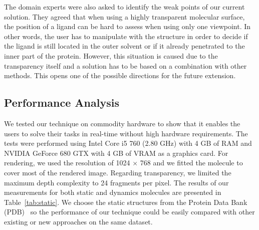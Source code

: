 The domain experts were also asked to identify the weak points of our current solution.
They agreed that when using a highly transparent molecular surface, the position of a ligand can be hard to assess when using only one viewpoint.
In other words, the user has to manipulate with the structure in order to decide if the ligand is still located in the outer solvent or if it already penetrated to the inner part of the protein.
However, this situation is caused due to the transparency itself and a solution has to be based on a combination with other methods.
This opens one of the possible directions for the future extension.

\subsection{Performance Analysis}
\label{sec:performance}

We tested our technique on commodity hardware to show that it enables the users to solve their tasks in real-time without high hardware requirements.
The tests were performed using Intel Core i5 760 (2.80 GHz) with 4 GB of RAM and NVIDIA GeForce 680 GTX with 4 GB of VRAM as a graphics card.
For rendering, we used the resolution of 1024 $\times$ 768 and we fitted the molecule to cover most of the rendered image.
Regarding transparency, we limited the maximum depth complexity to 24 fragments per pixel.
The results of our measurements for both static and dynamics molecules are presented in Table~\ref{tab:static}.
We choose the static structures from the Protein Data Bank (PDB)~\cite{sussman1998protein} so the performance of our technique could be easily compared with other existing or new approaches on the same dataset.

\setlength{\tabcolsep}{4.5pt}

